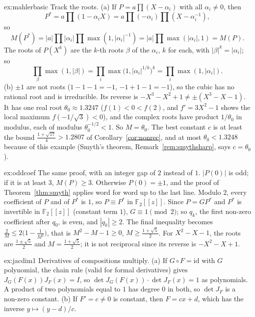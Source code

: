 \begin{solution}{ex:mahlerbasic}
\idea Track the roots.
\writeup (a) If $P=a\prod(X-\alpha_i)$ with all $\alpha_i\ne0$, then
\[
P^*=a\prod(1-\alpha_iX)=a\prod(-\alpha_i)\prod(X-\alpha_i^{-1}),
\]
so
\[
M(P^*)=|a|\prod|\alpha_i|\prod\max(1,|\alpha_i|^{-1})=|a|\prod\max(|\alpha_i|,1)=M(P).
\]
The roots of $P(X^k)$ are the $k$-th roots $\beta$ of the $\alpha_i$, $k$ for each, with $|\beta|^k=|\alpha_i|$; so
\[
\prod_\beta\max(1,|\beta|)=\prod_i\max\bigl(1,|\alpha_i|^{1/k}\bigr)^k=\prod_i\max(1,|\alpha_i|).
\]
(b) $\pm1$ are not roots ($1-1-1=-1$, $-1+1-1=-1$), so the cubic has no rational root and is irreducible. Its reverse is $-X^3-X^2+1\ne\pm(X^3-X-1)$. It has
one real root $\theta_0\approx1.3247$ ($f(1)<0<f(2)$, and $f'=3X^2-1$ shows the local maximum $f(-1/\sqrt3)<0$), and the complex roots have product
$1/\theta_0$ in modulus, each of modulus $\theta_0^{-1/2}<1$. So $M=\theta_0$. The best constant $c$ is at least the bound $\frac{1+\sqrt{17}}4>1.2807$ of
Corollary~\ref{cor:nonrec}, and at most $\theta_0<1.3248$ because of this example (Smyth's theorem, Remark~\ref{rem:smythsharp}, says $c=\theta_0$).
\end{solution}

\begin{solution}{ex:oddcoef}
\idea The same proof, with an integer gap of $2$ instead of $1$.
\writeup $|P(0)|$ is odd; if it is at least $3$, $M(P)\ge3$. Otherwise $P(0)=\pm1$, and the proof of Theorem~\ref{thm:smyth} applies word for word up to
the last line. Modulo $2$, every coefficient of $P$ and of $P^*$ is $1$, so $P\equiv P^*$ in $\mathbb F_2[[z]]$. Since $P=GP^*$ and $P^*$ is invertible in
$\mathbb F_2[[z]]$ (constant term $1$), $G\equiv1\pmod2$; so $q_k$, the first non-zero coefficient after $q_0$, is even, and $|q_k|\ge2$. The final inequality becomes
$\frac2M\le2\bigl(1-\frac1{M^2}\bigr)$, that is $M^2-M-1\ge0$, $M\ge\frac{1+\sqrt5}2$. For $X^2-X-1$, the roots are $\frac{1\pm\sqrt5}2$ and
$M=\frac{1+\sqrt5}2$; it is not reciprocal since its reverse is $-X^2-X+1$.
\end{solution}

\begin{solution}{ex:jacdim1}
\idea Derivatives of compositions multiply.
\writeup (a) If $G\circ F=\mathrm{id}$ with $G$ polynomial, the chain rule (valid for formal derivatives) gives $J_G(F(x))J_F(x)=I$, so
$\det J_G(F(x))\cdot\det J_F(x)=1$ as polynomials. A product of two polynomials equal to $1$ has degree $0$ in both, so $\det J_F$ is a non-zero constant.
(b) If $F'=c\ne0$ is constant, then $F=cx+d$, which has the inverse $y\mapsto(y-d)/c$.
\end{solution}

